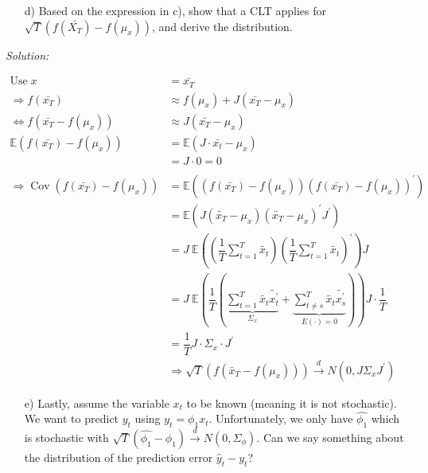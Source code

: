 \documentclass[12pt,a4paper]{article}
\newcommand{\Cov}{\operatorname{Cov}}
\begin{document}
\begin{itemize}
  \item[d)] Based on the expression in c), show that a CLT applies for $\sqrt{T} \left( f \left(\bar{X_T} \right) - f \left( \mu_x \right) \right)$, and derive the distribution. 
\end{itemize}

\emph{Solution:}

\begin{align*}
  \text{Use} \; x & = \bar{x_T}\\
  \Rightarrow f(\bar{x_T}) & \approx f(\mu_x) + J (\bar{x_T} - \mu_x)\\
  \Leftrightarrow f(\bar{x_T} - f(\mu_x)) & \approx J (\bar{x_T} - \mu_x)\\
  \mathbb{E} \left( f \left( \bar{x_T}\right) - f \left( \mu_x\right) \right) & = \mathbb{E} \left( J \cdot \bar{x_t} - \mu_x \right)\\
  & = J \cdot 0 = 0 \\
  \\
  \Rightarrow \Cov \left(  f \left( \bar{x_T}\right) - f \left( \mu_x\right) \right) & = \mathbb{E} \left( \left( f \left( \bar{x_T}\right) - f \left( \mu_x\right) \right) \left(  f \left( \bar{x_T}\right) - f \left( \mu_x\right) \right)^{'}  \right) \\
  & = \mathbb{E} \left( J  \left( \tilde{x_T} - \mu_x \right) \left( \tilde{x_T} - \mu_x \right)^{'} J^{'}  \right) \\
  & = J \ \mathbb{E} \left( \left( \dfrac{1}{T} \sum_{t = 1}^{T} \tilde{x_t} \right) \left( \dfrac{1}{T} \sum_{t = 1}^{T} \tilde{x_t} \right)^{'} \right) J\\
  & = J \ \mathbb{E} \left( \dfrac{1}{T} \left( \underbrace{\sum_{t = 1}^{T} \tilde{x_t} \tilde{x_t^{'}}}_{\Sigma_x} + \underbrace{\sum_{t \neq s}^{T} \tilde{x_t} \tilde{x_s^{'}}}_{E(\cdot) = 0 }  \right) \right) J \cdot \dfrac{1}{T}\\
  & = \dfrac{1}{T} J \cdot \Sigma_x \cdot J^{'}\\
  & \Rightarrow \sqrt{T} \left( f (\bar{x}_T - f(\mu_x)) \right) \overset{d}{\longrightarrow} N(0, J \Sigma_x J^{'})
\end{align*}

\begin{itemize}
  \item[e)] Lastly, assume the variable $x_t$ to be known (meaning it is not stochastic). We want to predict $y_t$ using $y_t = \phi_1 x_t$. Unfortunately, we only have $\widehat{\phi_1}$ which is stochastic with $\sqrt{T} \left( \widehat{\phi_1} - \phi_1 \right) \overset{d}{\longrightarrow} N(0, \Sigma_{\phi})$. Can we say something about the distribution of the prediction error $\hat{y}_t - y_t$?
\end{itemize}
\end{document}
